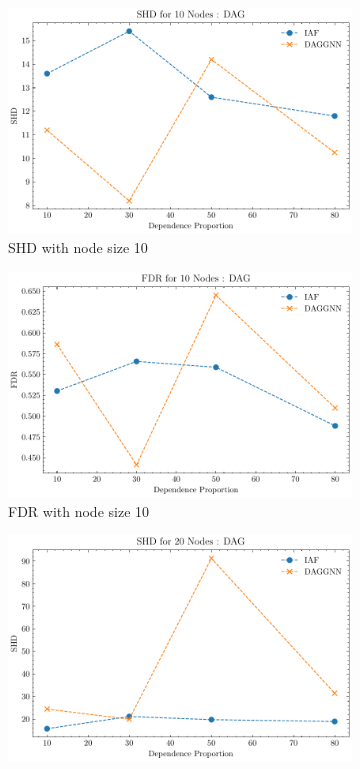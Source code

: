 \documentclass[10pt]{article}
\begin{document}
\begin{figure}[p]
    \centering
    \begin{subfigure}{0.45\textwidth}
        \includegraphics[width=\textwidth]{fig/SHD_dependence_10_DAG_threshold0.3.pdf}
        \caption{SHD with node size 10}
        \label{SHD_node10}
    \end{subfigure}
    \hfill
    \begin{subfigure}{0.45\textwidth}
        \includegraphics[width=\textwidth]{fig/FDR_dependence_10_DAG_threshold0.3.pdf}
        \caption{FDR with node size 10}
        \label{FDR_node10}
    \end{subfigure}
    \begin{subfigure}{0.45\textwidth}
        \includegraphics[width=\textwidth]{fig/SHD_dependence_20_DAG_threshold0.3.pdf}

\end{subfigure}
\end{figure}
\end{document}
